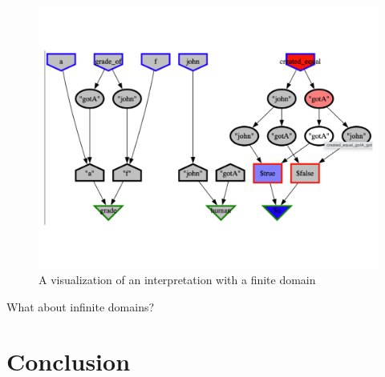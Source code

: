 \documentclass[letterpaper]{article}
\begin{document}
\begin{figure}[htbp]
\includegraphics[width=\columnwidth]{IIV.pdf}
\caption{A visualization of an interpretation with a finite domain}
\label{TF0FiniteIIV}
\end{figure}

What about infinite domains?

\section{Conclusion}
\label{Conclusion}



\end{document}
